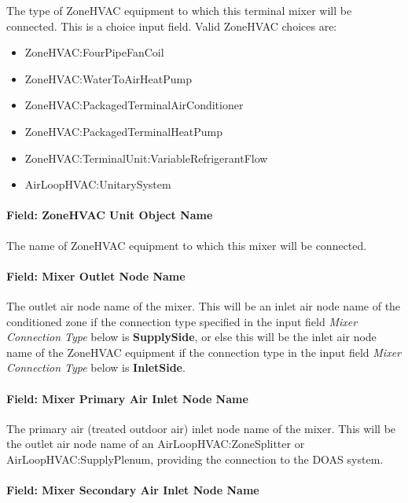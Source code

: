 The type of ZoneHVAC equipment to which this terminal mixer will be connected. This is a choice input field. 
Valid ZoneHVAC choices are:
\begin{itemize}
\setlength{\parskip}{0pt}
\setlength{\itemsep}{0pt plus 1pt}
\item ZoneHVAC:FourPipeFanCoil
\item ZoneHVAC:WaterToAirHeatPump
\item ZoneHVAC:PackagedTerminalAirConditioner
\item ZoneHVAC:PackagedTerminalHeatPump
\item ZoneHVAC:TerminalUnit:VariableRefrigerantFlow
\item AirLoopHVAC:UnitarySystem
\end{itemize}

\paragraph{Field: ZoneHVAC Unit Object Name}\label{field-zonehvac-unit-object-name}

The name of ZoneHVAC equipment to which this mixer will be connected.

\paragraph{Field: Mixer Outlet Node Name}\label{field-mixer-outlet-node-name}

The outlet air node name of the mixer. This will be an inlet air node name of the conditioned zone if the connection type specified in the input field \textit{Mixer Connection Type} below is \textbf{SupplySide}, or else this will be the inlet air node name of the ZoneHVAC equipment if the connection type in the input field \textit{Mixer Connection Type} below is \textbf{InletSide}.

\paragraph{Field: Mixer Primary Air Inlet Node Name}\label{field-mixer-primary-air-inlet-node-name}

The primary air (treated outdoor air) inlet node name of the mixer. This will be the outlet air node name of an AirLoopHVAC:ZoneSplitter or AirLoopHVAC:SupplyPlenum, providing the connection to the DOAS system.

\paragraph{Field: Mixer Secondary Air Inlet Node Name}\label{field-mixer-secondary-air-inlet-node-name}

